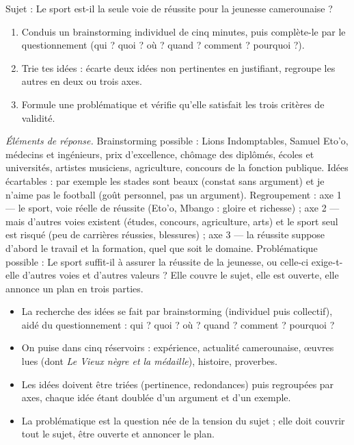 \documentclass[11pt]{article}
\newcommand{\cle}[1]{{\popxbold\color{popdark}#1}}
\begin{document}
\begin{exercice}
Sujet : \og Le sport est-il la seule voie de réussite pour la jeunesse camerounaise ? \fg
\begin{enumerate}
\item Conduis un brainstorming individuel de cinq minutes, puis complète-le par le questionnement (qui ? quoi ? où ? quand ? comment ? pourquoi ?).
\item Trie tes idées : écarte deux idées non pertinentes en justifiant, regroupe les autres en deux ou trois axes.
\item Formule une problématique et vérifie qu'elle satisfait les trois critères de validité.
\end{enumerate}
\end{exercice}

\begin{corrige}[Exercice 1]
\emph{Éléments de réponse.} Brainstorming possible : Lions Indomptables, Samuel Eto'o, médecins et ingénieurs, prix d'excellence, chômage des diplômés, écoles et universités, artistes musiciens, agriculture, concours de la fonction publique. Idées écartables : par exemple \og les stades sont beaux \fg{} (constat sans argument) et \og je n'aime pas le football \fg{} (goût personnel, pas un argument). Regroupement : axe 1 — le sport, voie réelle de réussite (Eto'o, Mbango : gloire et richesse) ; axe 2 — mais d'autres voies existent (études, concours, agriculture, arts) et le sport seul est risqué (peu de carrières réussies, blessures) ; axe 3 — la réussite suppose d'abord le travail et la formation, quel que soit le domaine. Problématique possible : \og Le sport suffit-il à assurer la réussite de la jeunesse, ou celle-ci exige-t-elle d'autres voies et d'autres valeurs ? \fg{} Elle couvre le sujet, elle est ouverte, elle annonce un plan en trois parties.
\end{corrige}

\begin{aretenir}
\begin{itemize}
\item La recherche des idées se fait par \cle{brainstorming} (individuel puis collectif), aidé du \cle{questionnement} : qui ? quoi ? où ? quand ? comment ? pourquoi ?
\item On puise dans cinq réservoirs : expérience, actualité camerounaise, œuvres lues (dont \emph{Le Vieux nègre et la médaille}), histoire, proverbes.
\item Les idées doivent être \cle{triées} (pertinence, redondances) puis \cle{regroupées par axes}, chaque idée étant doublée d'un argument et d'un exemple.
\item La \cle{problématique} est la question née de la tension du sujet ; elle doit couvrir tout le sujet, être ouverte et annoncer le plan.
\end{itemize}
\end{aretenir}
\end{document}
